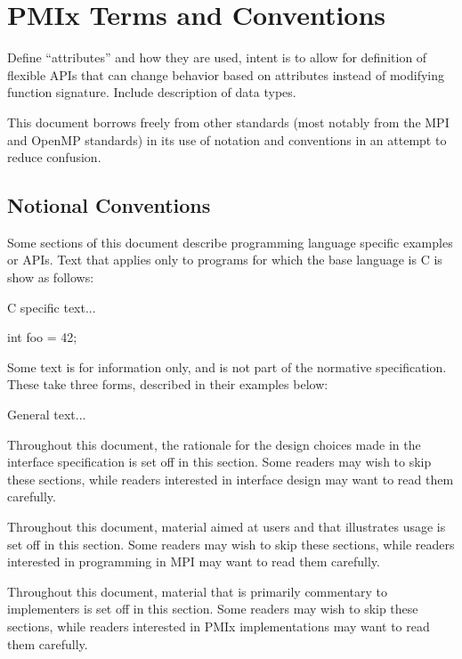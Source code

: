 \chapter{PMIx Terms and Conventions}
\label{chap:terms}

Define ``attributes'' and how they are used, intent is to allow for definition of flexible APIs that can change behavior based on attributes instead of modifying function signature.
Include description of data types.

This document borrows freely from other standards (most notably from the \ac{MPI} and OpenMP standards) in its use of notation and conventions in an attempt to reduce confusion.

\section{Notional Conventions}

Some sections of this document describe programming language specific examples or APIs.
Text that applies only to programs for which the base language is C is show as follows:

\cspecificstart
C specific text...
\begin{codepar}
int foo = 42;
\end{codepar}
\cspecificend

Some text is for information only, and is not part of the normative specification.
These take three forms, described in their examples below:

\notestart
\noteheader
General text...
\noteend

\rationalestart
Throughout this document, the rationale for the design choices made in the interface specification is set off in this section.
Some readers may wish to skip these sections, while readers interested in interface design may want to read them carefully.
\rationaleend

\adviceuserstart
Throughout this document, material aimed at users and that illustrates usage is set off in this section.
Some readers may wish to skip these sections, while readers interested in programming in \ac{MPI} may want to read them carefully.
\adviceuserend

\adviceimplstart
Throughout this document, material that is primarily commentary to implementers is set off in this section.
Some readers may wish to skip these sections, while readers interested in \ac{PMIx} implementations may want to read them carefully. 
\adviceimplend

